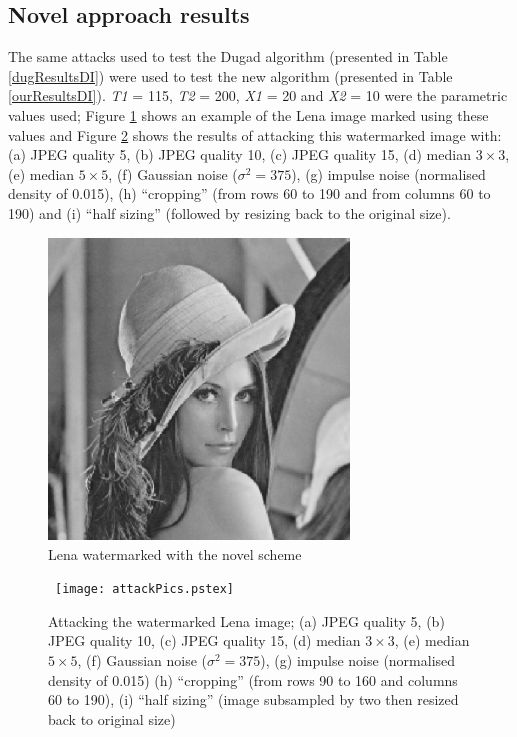 \documentclass[12pt]{report}
\begin{document}
\subsection{Novel approach results}
\label{ourResultsLenaDI}
The same attacks used to test the Dugad algorithm (presented in Table
\ref{dugResultsDI}) were used to test the new algorithm (presented in Table
\ref{ourResultsDI}). \emph{T1} = 115, \emph{T2} = 200, \emph{X1} = 20 and \emph{X2} = 10
were the parametric values used; Figure \ref{lenaNewPrettyDI} shows an example
of the Lena image marked using these values and Figure \ref{allAttacksDI} shows
the results of attacking this watermarked image with:
(a) JPEG quality 5, (b) JPEG quality 10, (c) JPEG quality 15,
(d) median $3 \times 3$, (e) median $5 \times 5$, (f) Gaussian noise ($\sigma^{2}=375$),
(g) impulse noise (normalised density of 0.015), (h) ``cropping'' 
(from rows 60 to 190 and from columns 60 to 190) and (i) ``half sizing''
(followed by resizing back to the original size).
\begin{figure}[htb]
	\begin{center}
		\includegraphics[height=8cm,width=8cm]{IM_seed100_115_200_20_10.ps}
		\caption{Lena watermarked with the novel scheme}
		\label{lenaNewPrettyDI}
	\end{center}
\end{figure}
\begin{figure}[p]
\setlength{\abovecaptionskip}{-0.2cm}
	\centerline{ \hbox{
		\texttt{[image: attackPics.pstex]}
	}}
		\caption{Attacking the watermarked Lena image; (a) JPEG quality 5, (b) JPEG quality 10, 
		(c) JPEG quality 15,
		(d) median $3\times3$, (e) median $5\times5$, (f) Gaussian noise ($\sigma^{2}=375$), 
		(g) impulse noise (normalised density of 0.015)
		(h) ``cropping'' (from rows 90 to 160 and columns 60 to 190), 
		(i) ``half sizing''
		(image subsampled by two then resized back to original size)}
		\label{allAttacksDI}
\end{figure}
\end{document}
